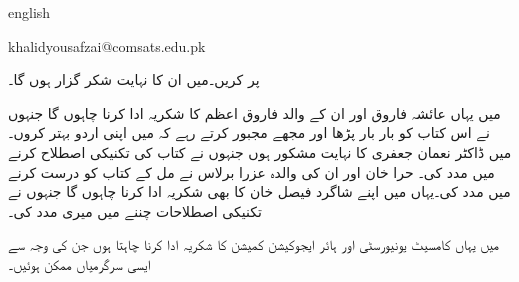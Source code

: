 {
\begin{otherlanguage*}{english}
\begin{LTR}
khalidyousafzai@comsats.edu.pk
\end{LTR}
\end{otherlanguage*}
}

 پر کریں۔میں ان کا نہایت شکر گزار ہوں گا۔

میں یہاں عائشہ فاروق اور ان کے والد فاروق اعظم کا شکریہ ادا کرنا چاہوں گا جنہوں نے  اس کتاب کو بار بار پڑھا اور مجھے مجبور کرتے رہے کہ میں اپنی اردو بہتر کروں۔میں ڈاکٹر نعمان جعفری کا نہایت مشکور ہوں جنہوں  نے کتاب کی تکنیکی اصطلاح کرنے میں مدد کی۔ حرا خان اور ان کی والدہ عزرا برلاس نے مل کے کتاب کو درست کرنے میں مدد کی۔یہاں میں اپنے شاگرد فیصل خان کا بھی شکریہ ادا کرنا چاہوں گا جنہوں نے تکنیکی اصطلاحات چننے میں میری مدد کی۔

میں یہاں کامسیٹ یونیورسٹی اور ہائر ایجوکیشن کمیشن کا شکریہ ادا کرنا چاہتا ہوں جن کی وجہ سے ایسی سرگرمیاں ممکن ہوئیں۔	
\vspace{5mm}

{}
